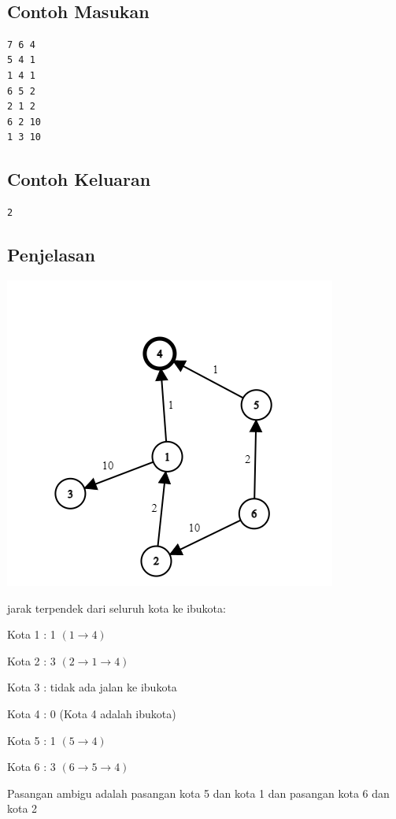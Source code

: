 \documentclass{article}
\begin{document}
\\

\begin{multicols}{2}
\subsection*{Contoh Masukan}
\begin{lstlisting}
7 6 4
5 4 1
1 4 1
6 5 2
2 1 2
6 2 10
1 3 10

\end{lstlisting}
\columnbreak
\subsection*{Contoh Keluaran}
\begin{lstlisting}
2 
\end{lstlisting}
\vfill
\null
\end{multicols}


\pagebreak
\subsection*{Penjelasan}
\begin{center}
    \includegraphics{graph.png}
\end{center}
jarak terpendek dari seluruh kota ke ibukota:

Kota 1 : 1 $(1 \rightarrow 4)$

Kota 2 : 3 $(2 \rightarrow 1 \rightarrow 4)$

Kota 3 : tidak ada jalan ke ibukota

Kota 4 : 0 (Kota 4 adalah ibukota)

Kota 5 : 1 $(5 \rightarrow 4)$

Kota 6 : 3 $(6 \rightarrow 5 \rightarrow 4)$

Pasangan ambigu adalah pasangan kota 5 dan kota 1 dan pasangan kota 6 dan kota 2


\pagebreak
\end{document}
